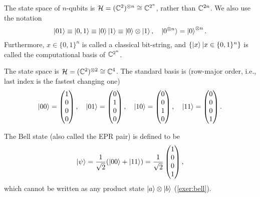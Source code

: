 The state space of $n$-qubits is $\mathcal{H}=(\mathbb{C}^2)^{\otimes n}\cong \mathbb{C}^{2^n}$, rather than $\mathbb{C}^{2n}$. We also use the notation
\begin{equation}
\ket{01}\equiv\ket{0,1}\equiv\ket{0}\ket{1}\equiv\ket{0}\otimes\ket{1}, \quad \ket{0^{\otimes n}}=\ket{0}^{\otimes n}. 
\end{equation}
Furthermore, $x\in\{0,1\}^n$ is called a classical bit-string, and $\{\ket{x}|x\in\{0,1\}^n\}$ is called the computational basis of $\mathbb{C}^{2^n}$.

\begin{exam} The state space is $\mathcal{H}=(\mathbb{C}^2)^{\otimes 2}\cong \mathbb{C}^{4}$. The standard basis is (row-major order, i.e., last index is the fastest changing one)
\begin{equation}
\ket{00}=
\begin{pmatrix}
1\\ 0 \\ 0 \\ 0
\end{pmatrix}, \quad
\ket{01}=
\begin{pmatrix}
0\\ 1 \\ 0 \\ 0
\end{pmatrix}, \quad
\ket{10}=
\begin{pmatrix}
0\\ 0 \\ 1 \\ 0
\end{pmatrix}, \quad
\ket{11}=
\begin{pmatrix}
0\\ 0 \\ 0 \\ 1
\end{pmatrix}.
\end{equation}

The Bell state (also called the EPR pair) is defined to be
\begin{equation}
\ket{\psi}=\frac{1}{\sqrt{2}}(\ket{00}+\ket{11})=\frac{1}{\sqrt{2}}
\begin{pmatrix}
1 \\ 0 \\ 0 \\ 1
\end{pmatrix},
\label{eqn:bell_state}
\end{equation}
which cannot be written as any product state $\ket{a}\otimes\ket{b}$ (\cref{exer:bell}).


\end{exam}
